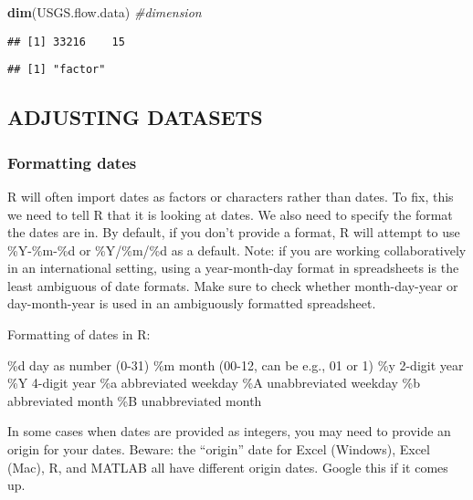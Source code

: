 \documentclass[]{article}
\newenvironment{Shaded}{\begin{snugshade}}{\end{snugshade}}
\newcommand{\KeywordTok}[1]{\textcolor[rgb]{0.13,0.29,0.53}{\textbf{#1}}}
\newcommand{\CommentTok}[1]{\textcolor[rgb]{0.56,0.35,0.01}{\textit{#1}}}
\newcommand{\OperatorTok}[1]{\textcolor[rgb]{0.81,0.36,0.00}{\textbf{#1}}}
\newcommand{\NormalTok}[1]{#1}
\begin{document}
\begin{Shaded}
\begin{Highlighting}[]
\KeywordTok{dim}\NormalTok{(USGS.flow.data) }\CommentTok{#dimension}
\end{Highlighting}
\end{Shaded}

\begin{verbatim}
## [1] 33216    15
\end{verbatim}

\begin{Shaded}
\end{Shaded}

\begin{verbatim}
## [1] "factor"
\end{verbatim}

\subsection{ADJUSTING DATASETS}\label{adjusting-datasets}

\subsubsection{Formatting dates}\label{formatting-dates}

R will often import dates as factors or characters rather than dates. To
fix, this we need to tell R that it is looking at dates. We also need to
specify the format the dates are in. By default, if you don't provide a
format, R will attempt to use \%Y-\%m-\%d or \%Y/\%m/\%d as a default.
Note: if you are working collaboratively in an international setting,
using a year-month-day format in spreadsheets is the least ambiguous of
date formats. Make sure to check whether month-day-year or
day-month-year is used in an ambiguously formatted spreadsheet.

Formatting of dates in R:

\%d day as number (0-31) \%m month (00-12, can be e.g., 01 or 1) \%y
2-digit year \%Y 4-digit year \%a abbreviated weekday \%A unabbreviated
weekday \%b abbreviated month \%B unabbreviated month

In some cases when dates are provided as integers, you may need to
provide an origin for your dates. Beware: the ``origin'' date for Excel
(Windows), Excel (Mac), R, and MATLAB all have different origin dates.
Google this if it comes up.
\end{document}
